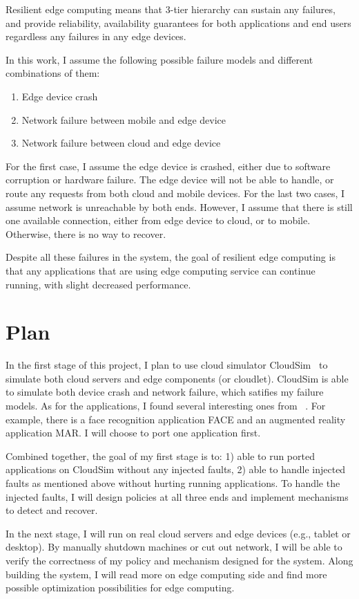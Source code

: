 Resilient edge computing means that 3-tier hierarchy can sustain any failures, and
provide reliability, availability guarantees for both applications and end users
regardless any failures in any edge devices.

In this work, I assume the following possible failure models and different combinations
of them:
\begin{enumerate}
\item Edge device crash
\item Network failure between mobile and edge device
\item Network failure between cloud and edge device
\end{enumerate}

For the first case, I assume the edge device is crashed, either due to software
corruption or hardware failure. The edge device will not be able to handle, or
route any requests from both cloud and mobile devices. For the last two cases,
I assume network is unreachable by both ends. However, I assume that there is
still one available connection, either from edge device to cloud, or to mobile.
Otherwise, there is no way to recover.

Despite all these failures in the system, the goal of resilient edge computing
is that any applications that are using edge computing service can continue
running, with slight decreased performance.

\section{Plan}
In the first stage of this project, I plan to use cloud simulator CloudSim~\cite{cloudsim}
to simulate both cloud servers and edge components (or cloudlet). CloudSim
is able to simulate both device crash and network failure, which satifies my
failure models. As for the applications, I found several interesting ones from ~\cite{quantify-edge}.
For example, there is a face recognition application FACE and an augmented reality application MAR.
I will choose to port one application first.

Combined together, the goal of my first stage is to: 1) able to run ported applications
on CloudSim without any injected faults, 2) able to handle injected faults as mentioned
above without hurting running applications. To handle the injected faults, I will design
policies at all three ends and implement mechanisms to detect and recover.

In the next stage, I will run on real cloud servers and edge devices (e.g., tablet or desktop).
By manually shutdown machines or cut out network, I will be able to verify the correctness
of my policy and mechanism designed for the system. Along building the system, I will read
more on edge computing side and find more possible optimization possibilities for edge computing.

